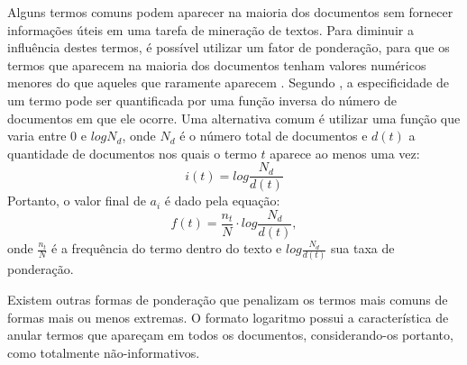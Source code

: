 Alguns termos comuns podem aparecer na maioria dos documentos sem fornecer informações úteis em uma tarefa de mineração de textos. Para diminuir a influência destes termos, é possível utilizar um fator de ponderação, para que os termos que aparecem na maioria dos documentos tenham valores numéricos menores do que aqueles que raramente aparecem \cite{pretext}. Segundo , a especificidade de um termo pode ser quantificada por uma função inversa do número de documentos em que ele ocorre. Uma alternativa comum é utilizar uma função que varia entre \(0\) e \(log N_d\), onde \(N_d\) é o número total de documentos e \(d(t)\) a quantidade de documentos nos quais o termo \(t\) aparece ao menos uma vez:
%
\begin{equation}
i(t)=log \frac{N_d}{d(t)}
\end{equation}
%
Portanto, o valor final de \(a_{i}\) é dado pela equação:
%
\begin{equation}
f(t)=\frac{n_t}{N} \cdot log \frac{N_d}{d(t)},
\end{equation}
%
onde \(\frac{n_t}{N}\) é a frequência do termo dentro do texto e \(log \frac{N_d}{d(t)}\) sua taxa de ponderação.

Existem outras formas de ponderação que penalizam os termos mais comuns de formas mais ou menos extremas.
O formato logaritmo possui a característica de anular termos que apareçam em todos os documentos, considerando-os
portanto, como totalmente não-informativos.
